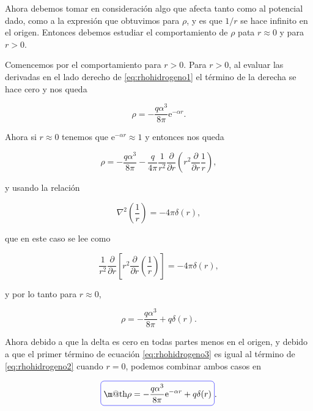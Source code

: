 \documentclass[a4paper,10pt]{article}
\makeatletter
\numberwithin{equation}{section}
\newcommand*{\boxcolor}{blue}
\renewcommand{\boxed}[1]{\textcolor{\boxcolor}{%
\tikz[baseline={([yshift=-1ex]current bounding box.center)}] \node [rectangle, minimum width=1ex,rounded corners,draw] {\normalcolor\m@th$\displaystyle#1$};}}
\newcommand{\euler}{\mathrm{e}}
\makeatother
\begin{document}
Ahora debemos tomar en consideración algo que afecta tanto como al potencial dado,
como a la expresión que obtuvimos para $\rho$, y es que $1/r$ se hace infinito en 
el origen. Entonces debemos estudiar el comportamiento de $\rho$ pata $r \approx 
0$ y para $r > 0$. 

\vspace{.3cm}

Comencemos por el comportamiento para $r > 0$. Para $r > 0$, al evaluar las derivadas 
en el lado derecho de \eqref{eq:rhohidrogeno1} el término de la derecha se hace 
cero y nos queda 

\begin{equation}
 \rho = - \frac{q\alpha^3}{8\pi}\euler^{-\alpha r}. 
 \label{eq:rhohidrogeno2}
\end{equation}

Ahora si $r \approx 0$ tenemos que $\euler^{-\alpha r} \approx 1$ y entonces 
nos queda 

\begin{equation}
\rho = - \frac{q\alpha^3}{8\pi}- 
 \frac{q}{4\pi}\frac{1}{r^2}\frac{\partial}{\partial r}
 \left(r^2\frac{\partial}{\partial r}\frac{1}{r} \right),
\end{equation}

y usando la relación 

\begin{equation}
 \nabla^2\left(\frac{1}{r} \right) = - 4\pi \delta(r),
\end{equation}

que en este caso se lee como 

\begin{equation}
 \frac{1}{r^2}\frac{\partial}{\partial r}\left[r^2\frac{\partial}{\partial r}
 \left(\frac{1}{r} \right)\right] = - 4\pi \delta(r),
\end{equation}

y por lo tanto para $r \approx 0$, 

\begin{equation}
 \rho = - \frac{q\alpha^3}{8\pi} + q\delta(r).
 \label{eq:rhohidrogeno3}
\end{equation}

Ahora debido a que la delta es cero en todas partes menos en el origen, y debido 
a que el primer término de ecuación \eqref{eq:rhohidrogeno3} es igual al término 
de \eqref{eq:rhohidrogeno2} cuando $r=0$, podemos combinar ambos casos en 

\begin{equation}
 \boxed{\rho = - \frac{q\alpha^3}{8\pi}\euler^{-\alpha r} + q\delta(r)}.
\end{equation}
\end{document}
